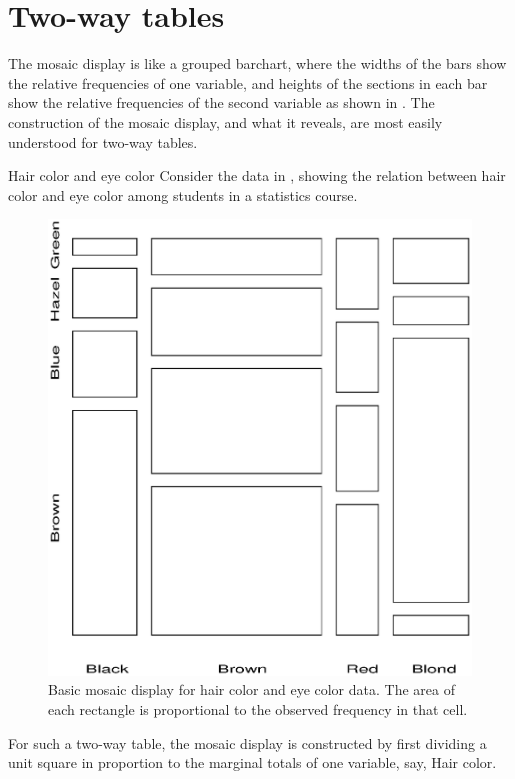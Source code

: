 \section{Two-way tables}\label{sec:mosaic-twoway}
The mosaic display 
\citep{Friendly:92b,Friendly:94a,Friendly:97,HartiganKleiner:81,HartiganKleiner:84}
is like a grouped barchart,
where the widths of the bars show the relative frequencies of one
variable, and heights of the sections in each bar show the
relative frequencies of the second variable as shown in .
The construction of the mosaic display, and what it reveals,
are most easily understood for two-way tables.

\begin{Example}[haireye2a]{Hair color and eye color}
Consider the data in ,
showing the relation between hair color and eye color among students
in a statistics course.
\begin{figure}[htb]
  \centering
  \includegraphics[scale=.6]{ch4/fig/mosaic31}
  \caption[Basic mosaic display for hair color and eye color data]{Basic mosaic display for hair color and eye color data.  The area of each
  rectangle is proportional to the observed frequency in that cell.}%
  \label{fig:mosaic31}
\end{figure}
For such a two-way table, the mosaic display is constructed
by first dividing a unit square in proportion to the marginal
totals of one variable, say, Hair color.


\end{Example}
